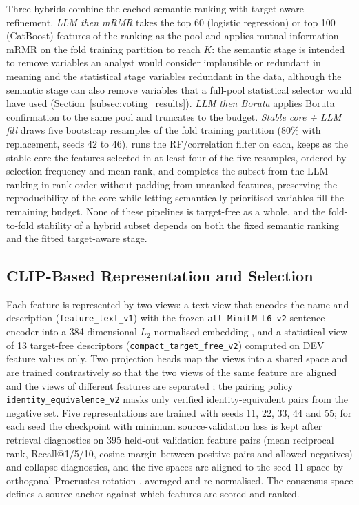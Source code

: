 \documentclass[final,5p,twocolumn]{elsarticle}
\newcommand{\Kfeat}{K}
\begin{document}
Three hybrids combine the cached semantic ranking with target-aware refinement. \emph{LLM then mRMR} takes the top 60 (logistic regression) or top 100 (CatBoost) features of the ranking as the pool and applies mutual-information mRMR on the fold training partition to reach $\Kfeat$: the semantic stage is intended to remove variables an analyst would consider implausible or redundant in meaning and the statistical stage variables redundant in the data, although the semantic stage can also remove variables that a full-pool statistical selector would have used (Section~\ref{subsec:voting_results}). \emph{LLM then Boruta} applies Boruta confirmation to the same pool and truncates to the budget. \emph{Stable core + LLM fill} draws five bootstrap resamples of the fold training partition (80\% with replacement, seeds 42 to 46), runs the RF/correlation filter on each, keeps as the stable core the features selected in at least four of the five resamples, ordered by selection frequency and mean rank, and completes the subset from the LLM ranking in rank order without padding from unranked features, preserving the reproducibility of the core while letting semantically prioritised variables fill the remaining budget. None of these pipelines is target-free as a whole, and the fold-to-fold stability of a hybrid subset depends on both the fixed semantic ranking and the fitted target-aware stage.

\subsection{CLIP-Based Representation and Selection}
\label{subsec:clip_fs}

\begin{sloppypar}
Each feature is represented by two views: a text view that encodes the name and description (\texttt{feature\_\allowbreak text\_\allowbreak v1}) with the frozen \texttt{all-\allowbreak MiniLM-\allowbreak L6-\allowbreak v2} sentence encoder into a 384-dimensional $L_2$-normalised embedding \cite{wang2020minilm,reimers2019}, and a statistical view of 13 target-free descriptors (\texttt{compact\_\allowbreak target\_\allowbreak free\_\allowbreak v2}) computed on DEV feature values only. Two projection heads map the views into a shared space and are trained contrastively so that the two views of the same feature are aligned and the views of different features are separated \cite{radford2021,oord2018}; the pairing policy \texttt{identity\_\allowbreak equivalence\_\allowbreak v2} masks only verified identity-equivalent pairs from the negative set. Five representations are trained with seeds 11, 22, 33, 44 and 55; for each seed the checkpoint with minimum source-validation loss is kept after retrieval diagnostics on 395 held-out validation feature pairs (mean reciprocal rank, Recall@1/5/10, cosine margin between positive pairs and allowed negatives) and collapse diagnostics, and the five spaces are aligned to the seed-11 space by orthogonal Procrustes rotation \cite{schonemann1966}, averaged and re-normalised. The consensus space defines a source anchor against which features are scored and ranked.
\end{sloppypar}
\end{document}
